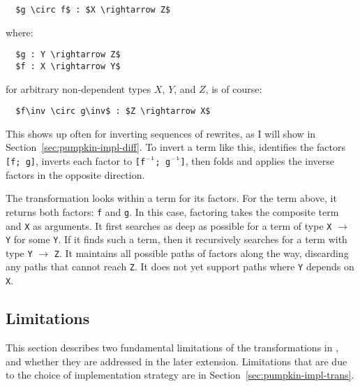 \begin{lstlisting}
  $g \circ f$ : $X \rightarrow Z$
\end{lstlisting}
where:

\begin{lstlisting}
  $g : Y \rightarrow Z$
  $f : X \rightarrow Y$
\end{lstlisting}
for arbitrary non-dependent types $X$, $Y$, and $Z$,
is of course:

\begin{lstlisting}
  $f\inv \circ g\inv$ : $Z \rightarrow X$ 
\end{lstlisting}
This shows up often for inverting sequences of rewrites, as I will show in Section~\ref{sec:pumpkin-impl-diff}.
To invert a term like this, \sysname identifies the factors \lstinline{[f; g]}, 
inverts each factor to \lstinline{[f}$\inv$\lstinline{; g}$\inv$\lstinline{]}, 
then folds and applies the inverse factors in the opposite direction.

The  transformation looks within a term for its factors.
For the term above, it returns both factors: \lstinline{f} and \lstinline{g}.
In this case, factoring takes the composite term and \lstinline{X} as arguments.
It first searches as deep as possible for a term of type \lstinline{X} $\rightarrow$ \lstinline{Y} for some \lstinline{Y}.
If it finds such a term, then it recursively searches for a term with type \lstinline{Y} $\rightarrow$ \lstinline{Z}. 
It maintains all possible 
paths of factors along the way, discarding any paths that cannot reach \lstinline{Z}.
It does not yet support paths where \lstinline{Y} depends on \lstinline{X}.

\subsection{Limitations}
\label{sec:pumpkin-trans-limitations}

This section describes two fundamental limitations of the transformations in \sysname,
and whether they are addressed in the later \toolnamec extension.
Limitations that are due to the choice of implementation strategy are in Section~\ref{sec:pumpkin-impl-trans}.

